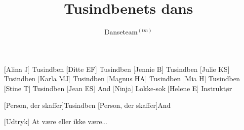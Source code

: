 \documentclass[a4paper,11pt]{article}
\title{Tusindbenets dans}
\author{Danseteam$^{(tm)}$}
\begin{document}
\maketitle

\begin{roles}
[Alina J] Tusindben
[Ditte EF] Tusindben
[Jennie B] Tusindben
[Julie KS] Tusindben
[Karla MJ] Tusindben
[Magnus HA] Tusindben
[Mia H] Tusindben
[Stine T] Tusindben
[Jean ES] And
[Ninja] Lokke-sok
[Helene E] Instruktør
\end{roles}

\begin{props}
[Person, der skaffer]Tusindben
[Person, der skaffer]And
\end{props}


\begin{sketch}


[Udtryk] At være eller ikke være... 



\end{sketch}
\end{document}
